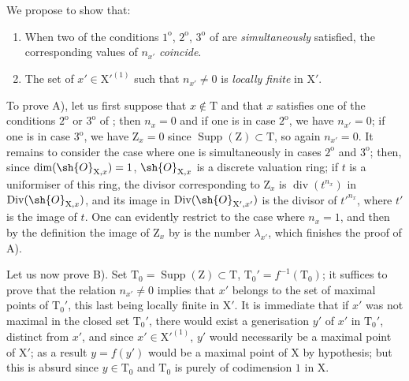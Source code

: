 \begin{env}[21.10.2]
\label{IV.21.10.2}
We propose to show that:
\begin{enumerate}[label=\emph{\Alph*)}]
  \item When two of the conditions $1^{\mathrm{o}}$, $2^{\mathrm{o}}$, $3^{\mathrm{o}}$ of  are \emph{simultaneously} satisfied, the corresponding values of $n_{x'}$ \emph{coincide}.
  \item The set of $x'\in\mathrm{X}'^{(1)}$ such that $n_{x'}\neq 0$ is \emph{locally finite} in $\mathrm{X}'$.
\end{enumerate}

To prove A), let us first suppose that $x\notin\mathrm{T}$ and that $x$ satisfies one of the conditions $2^{\mathrm{o}}$ or $3^{\mathrm{o}}$ of ; then $n_x=0$ and if one is in case $2^{\mathrm{o}}$, we have $n_{x'}=0$; if one is in case $3^{\mathrm{o}}$, we have $\mathrm{Z}_x=0$ since $\operatorname{Supp}(\mathrm{Z})\subset\mathrm{T}$, so again $n_{x'}=0$.
It remains to consider the case where one is simultaneously in cases $2^{\mathrm{o}}$ and $3^{\mathrm{o}}$; then, since $\dim(\sh{O}_{\mathrm{X},x})=1$, $\sh{O}_{\mathrm{X},x}$ is a discrete valuation ring; if $t$ is a uniformiser of this ring, the divisor corresponding to $\mathrm{Z}_x$ is $\operatorname{div}(t^{n_x})$ in $\operatorname{Div}(\sh{O}_{\mathrm{X},x})$, and its image in $\operatorname{Div}(\sh{O}_{\mathrm{X}',x'})$ is the divisor of $t'^{n_x}$, where $t'$ is the image of $t$.
One can evidently restrict to the case where $n_x=1$, and then by the definition  the image of $\mathrm{Z}_x$ by  is the number $\lambda_{x'}$, which finishes the proof of A).

Let us now prove B).
Set $\mathrm{T}_0=\operatorname{Supp}(\mathrm{Z})\subset\mathrm{T}$, $\mathrm{T}_0'=f^{-1}(\mathrm{T}_0)$; it suffices to prove that the relation $n_{x'}\neq 0$ implies that $x'$ belongs to the set of maximal points of $\mathrm{T}_0'$, this last being locally finite in $\mathrm{X}'$.
It is immediate that if $x'$ was not maximal in the closed set $\mathrm{T}_0'$, there would exist
a generisation $y'$ of $x'$ in $\mathrm{T}_0'$, distinct from $x'$, and since $x'\in\mathrm{X}'^{(1)}$, $y'$ would necessarily be a maximal point of $\mathrm{X}'$; as a result $y=f(y')$ would be a maximal point of $\mathrm{X}$ by hypothesis; but this is absurd since $y\in\mathrm{T}_0$ and $\mathrm{T}_0$ is purely of codimension $1$ in $\mathrm{X}$.
\end{env}

